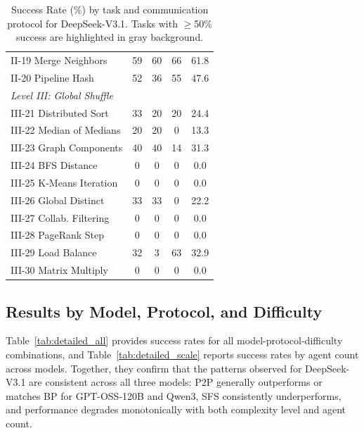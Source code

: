 \begin{table}[t]
\begin{tabular}{l ccc c}
II-19 Merge Neighbors & \cellcolor{gray!30}59 & \cellcolor{gray!30}60 & \cellcolor{gray!30}66 & \cellcolor{gray!30}61.8 \\
II-20 Pipeline Hash & \cellcolor{gray!30}52 & 36 & \cellcolor{gray!30}55 & 47.6 \\
\midrule
\multicolumn{5}{l}{\textit{Level III: Global Shuffle}} \\
III-21 Distributed Sort & 33 & 20 & 20 & 24.4 \\
III-22 Median of Medians & 20 & 20 & 0 & 13.3 \\
III-23 Graph Components & 40 & 40 & 14 & 31.3 \\
III-24 BFS Distance & 0 & 0 & 0 & 0.0 \\
III-25 K-Means Iteration & 0 & 0 & 0 & 0.0 \\
III-26 Global Distinct & 33 & 33 & 0 & 22.2 \\
III-27 Collab. Filtering & 0 & 0 & 0 & 0.0 \\
III-28 PageRank Step & 0 & 0 & 0 & 0.0 \\
III-29 Load Balance & 32 & 3 & \cellcolor{gray!30}63 & 32.9 \\
III-30 Matrix Multiply & 0 & 0 & 0 & 0.0 \\
\bottomrule
\end{tabular}
\caption{Success Rate (\%) by task and communication protocol for DeepSeek-V3.1. Tasks with $\geq$50\% success are highlighted in gray background.}
\label{tab:deepseek_detail}
\end{table}


\subsection{Results by Model, Protocol, and Difficulty}

Table~\ref{tab:detailed_all} provides success rates for all model-protocol-difficulty combinations, and Table~\ref{tab:detailed_scale} reports success rates by agent count across models. Together, they confirm that the patterns observed for DeepSeek-V3.1 are consistent across all three models: P2P generally outperforms or matches BP for GPT-OSS-120B and Qwen3, SFS consistently underperforms, and performance degrades monotonically with both complexity level and agent count.

